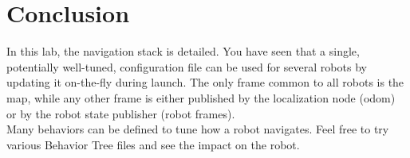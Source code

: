 \documentclass{ecnreport}
\begin{document}
\section{Conclusion}

In this lab, the navigation stack is detailed. You have seen that a single, potentially well-tuned, configuration file can be used for several robots by updating it on-the-fly during launch. The only frame common to all robots is the map, while any other frame is either published by the localization node (odom) or by the robot state publisher (robot frames). \\

Many behaviors can be defined to tune how a robot navigates. Feel free to try various Behavior Tree files and see the impact on the robot.
\end{document}
